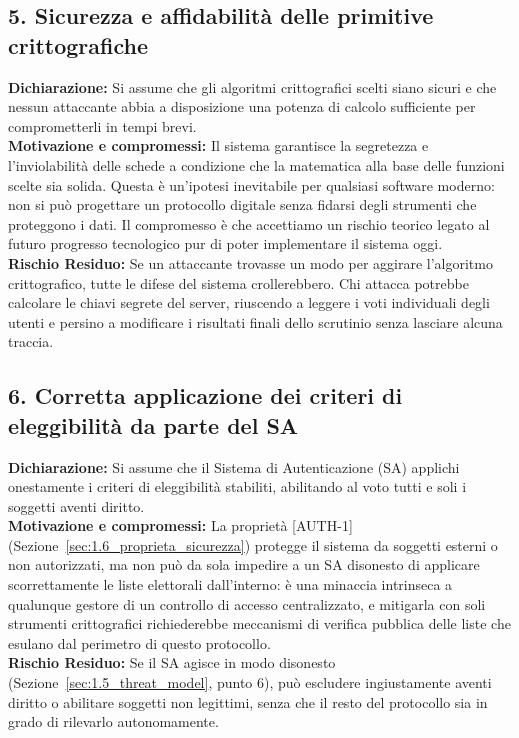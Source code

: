 \subsection*{5. Sicurezza e affidabilità delle primitive crittografiche}
\textbf{Dichiarazione:} Si assume che gli algoritmi crittografici scelti siano sicuri e che nessun attaccante abbia a disposizione una potenza di calcolo sufficiente per comprometterli in tempi brevi. \\
\textbf{Motivazione e compromessi:} Il sistema garantisce la segretezza e l'inviolabilità delle schede a condizione che la matematica alla base delle funzioni scelte sia solida. Questa è un'ipotesi inevitabile per qualsiasi software moderno: non si può progettare un protocollo digitale senza fidarsi degli strumenti che proteggono i dati. Il compromesso è che accettiamo un rischio teorico legato al futuro progresso tecnologico pur di poter implementare il sistema oggi. \\
\textbf{Rischio Residuo:} Se un attaccante trovasse un modo per aggirare l'algoritmo crittografico, tutte le difese del sistema crollerebbero. Chi attacca potrebbe calcolare le chiavi segrete del server, riuscendo a leggere i voti individuali degli utenti e persino a modificare i risultati finali dello scrutinio senza lasciare alcuna traccia.

\subsection*{6. Corretta applicazione dei criteri di eleggibilità da parte del SA}
\textbf{Dichiarazione:} Si assume che il Sistema di Autenticazione (SA) applichi onestamente i criteri di eleggibilità stabiliti, abilitando al voto tutti e soli i soggetti aventi diritto. \\
\textbf{Motivazione e compromessi:} La proprietà [AUTH-1] (Sezione~\ref{sec:1.6_proprieta_sicurezza}) protegge il sistema da soggetti esterni o non autorizzati, ma non può da sola impedire a un SA disonesto di applicare scorrettamente le liste elettorali dall'interno: è una minaccia intrinseca a qualunque gestore di un controllo di accesso centralizzato, e mitigarla con soli strumenti crittografici richiederebbe meccanismi di verifica pubblica delle liste che esulano dal perimetro di questo protocollo. \\
\textbf{Rischio Residuo:} Se il SA agisce in modo disonesto (Sezione~\ref{sec:1.5_threat_model}, punto 6), può escludere ingiustamente aventi diritto o abilitare soggetti non legittimi, senza che il resto del protocollo sia in grado di rilevarlo autonomamente.


